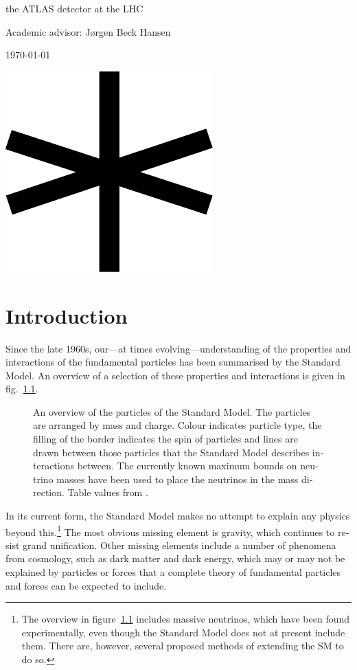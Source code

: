 \begin{english}
\begin{titlingpage}
{{{the ATLAS detector at the LHC}
\vspace{7em}

{\Large Academic advisor: Jørgen Beck Hansen}
\vfill

\today}
\clearpage}
\thispagestyle{empty}
  \phantom{p}
\vspace{1.16\textwidth}

\begin{center}
\includegraphics[width=.1\textwidth]{star1}
\end{center}
\clearpage
\end{titlingpage}
\frontmatter

\tableofcontents
\mainmatter

\chapter{Introduction}

Since the late 1960s, our---at times evolving---understanding of the properties and interactions of the fundamental particles has been summarised by the Standard Model. An overview of a selection of these properties and interactions is given in fig.~\ref{SMsum}.

\begin{figure}[hbt]
\begin{minipage}[b]{.74\textwidth}

\end{minipage}
\hfill\begin{minipage}[b]{.25\textwidth}
\caption{An overview of the particles of the Standard Model. The particles are arranged by mass and charge. Colour indicates particle type, the filling of the border indicates the spin of particles and lines are drawn between those particles that the Standard Model describes interactions between. The currently known maximum bounds on neutrino masses have been used to place the neutrinos in the mass direction. Table values from \cite{wikism}.\label{SMsum}}
\end{minipage}
\end{figure}

In its current form, the Standard Model makes no attempt to explain any physics beyond this.\footnote{The overview in figure~\ref{SMsum} includes massive neutrinos, which have been found experimentally, even though the Standard Model does not at present include them. There are, however, several proposed methods of extending the SM to do so.} The most obvious missing element is gravity, which continues to resist grand unification. Other missing elements include a number of phenomena from cosmology, such as dark matter and dark energy, which may or may not be explained by particles or forces that a complete theory of fundamental particles and forces can be expected to include.


\end{english}

